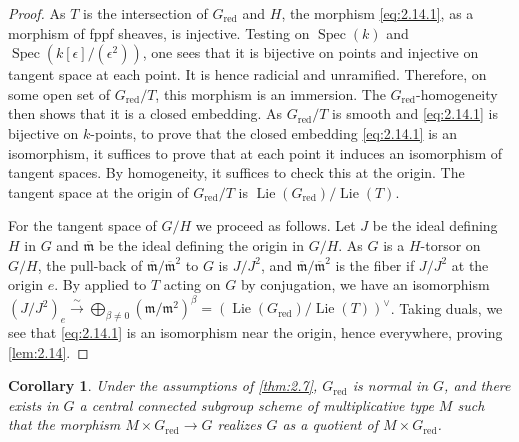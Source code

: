 \documentclass[11pt,a4paper]{article}
\theoremstyle{plain}
\newtheorem{corollary}[theorem]{Corollary}
\theoremstyle{definition}
\DeclareMathOperator{\Spec}{Spec}
\DeclareMathOperator{\Lie}{Lie}
\newcommand{\red}{\mathrm{red}}
\begin{document}
\begin{proof}
As $T$ is the intersection of $G_\red$ and $H$, the morphism \eqref{eq:2.14.1}, as a morphism of fppf sheaves, is injective. Testing on $\Spec(k)$ and $\Spec(k[\epsilon]/(\epsilon^2))$, one sees that it is bijective on points and injective on tangent space at each point. It is hence radicial and unramified. Therefore, on some open set of $G_\red/T$, this morphism is an immersion. The $G_\red$-homogeneity then shows that it is a closed embedding. As $G_\red/T$ is smooth and \eqref{eq:2.14.1} is bijective on $k$-points, to prove that the closed embedding \eqref{eq:2.14.1} is an isomorphism, it suffices to prove that at each point it induces an isomorphism of tangent spaces. By homogeneity, it suffices to check this at the origin. The tangent space at the origin of $G_\red/T$ is $\Lie(G_\red)/\Lie(T)$.

For the tangent space of $G/H$ we proceed as follows. Let $J$ be the ideal defining $H$ in $G$ and $\overline{\mathfrak{m}}$ be the ideal defining the origin in $G/H$. As $G$ is a $H$-torsor on $G/H$, the pull-back of $\overline{\mathfrak{m}}/\overline{\mathfrak{m}}^2$ to $G$ is $J/J^2$, and $\overline{\mathfrak{m}}/\overline{\mathfrak{m}}^2$ is the fiber if $J/J^2$ at the origin $e$. By \cite[2.15]{D} applied to $T$ acting on $G$ by conjugation, we have an isomorphism $(J/J^2)_e \xrightarrow{\sim} \bigoplus_{\beta \neq 0} (\mathfrak{m}/\mathfrak{m}^2)^\beta = (\Lie(G_\red)/\Lie(T))^\vee$. Taking duals, we see that \eqref{eq:2.14.1} is an isomorphism near the origin, hence everywhere, proving \ref{lem:2.14}. \qedhere
\end{proof}

\begin{corollary} \label{cor:2.15}
Under the assumptions of \ref{thm:2.7}, $G_\red$ is normal in $G$, and there exists in $G$ a central connected subgroup scheme of multiplicative type $M$ such that the morphism $M \times G_\red \to G$ realizes $G$ as a quotient of $M \times G_\red$.
\end{corollary}
\end{document}
